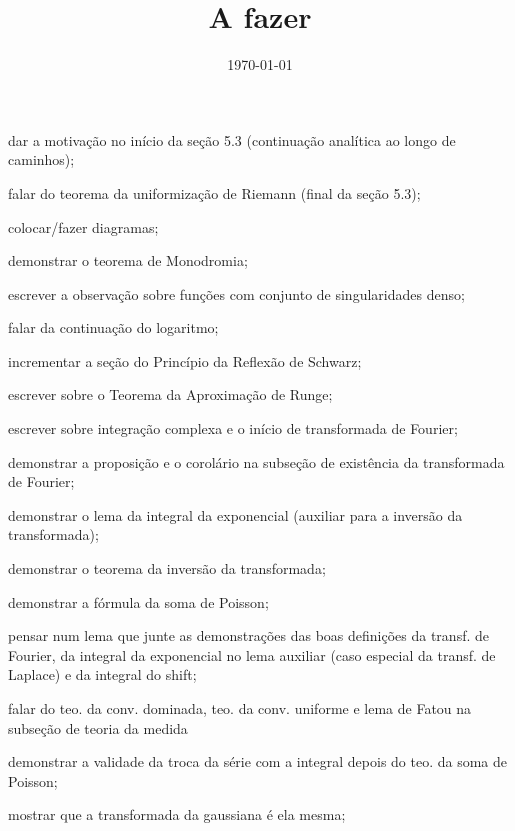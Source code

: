 \documentclass[12pt,a4paper]{article}
\title{A fazer}
\author{}
\date{\today}
\newcommand{\cmark}{\ding{51}}%
\newcommand{\done}{\rlap{$\square$}{\raisebox{2pt}{\large\hspace{1pt}\cmark}}%
\hspace{-2.5pt}}
\begin{document}
\maketitle

\begin{todolist}
    \item dar a motivação no início da seção 5.3 (continuação analítica ao longo
    de caminhos);
    \item falar do teorema da uniformização de Riemann (final da seção 5.3); 
    \item colocar/fazer diagramas;
    \item[\done] demonstrar o teorema de Monodromia;
    \item[\done] escrever a observação sobre funções com conjunto de singularidades denso;
    \item[\done] falar da continuação do logaritmo;
    \item[\done] incrementar a seção do Princípio da Reflexão de Schwarz;
    \item[\done] escrever sobre o Teorema da Aproximação de Runge;
    \item[\done] escrever sobre integração complexa e o início de transformada de Fourier;
    \item[\done] demonstrar a proposição e o corolário na subseção de existência da transformada de Fourier;
    \item[\done] demonstrar o lema da integral da exponencial (auxiliar para a inversão da transformada);
    \item[\done] demonstrar o teorema da inversão da transformada;
    \item[\done] demonstrar a fórmula da soma de Poisson;
    \item pensar num lema que junte as demonstrações das boas definições da transf. de Fourier,
          da integral da exponencial no lema auxiliar (caso especial da transf. de Laplace) e
          da integral do shift;
    \item falar do teo. da conv. dominada, teo. da conv. uniforme e lema de
    Fatou na subseção de teoria da medida
    \item demonstrar a validade da troca da série com a integral depois do teo. da soma de Poisson;
    \item[\done] mostrar que a transformada da gaussiana é ela mesma;

\end{todolist}
\end{document}
